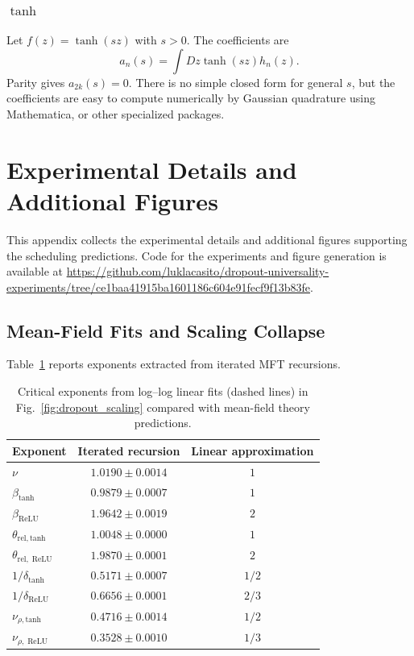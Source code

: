 \documentclass{article}
\DeclareMathOperator{\ReLU}{ReLU}
\theoremstyle{plain}
\theoremstyle{definition}
\theoremstyle{remark}
\begin{document}
\subsubsection{\texorpdfstring{\(\tanh\)}{tanh}}

Let \(f(z)=\tanh(s z)\) with \(s>0\). The coefficients are
\relax
\begin{equation}
a_{n}(s)=\int Dz \tanh(s z) h_{n}(z).
\end{equation}
\relax
Parity gives \(a_{2k}(s)=0\). There is no simple closed form for general \(s\), but the coefficients are easy to compute numerically by Gaussian quadrature using Mathematica, or other specialized packages.










\section{Experimental Details and Additional Figures}
\label{app:experimental_info}
This appendix collects the experimental details and additional figures supporting the scheduling predictions. Code for the experiments and figure generation is available at \url{https://github.com/luklacasito/dropout-universality-experiments/tree/ce1baa41915ba1601186c604e91fecf9f13b83fe}.










\subsection{Mean-Field Fits and Scaling Collapse}
Table~\ref{tab:mf_vs_fit_exponents} reports exponents extracted from iterated MFT recursions.
\begin{table}[ht]
\caption{Critical exponents from log--log linear fits (dashed lines) in Fig.~\ref{fig:dropout_scaling} compared with mean-field theory predictions.}
\label{tab:mf_vs_fit_exponents}
\centering
\begin{tabular}{lcc}
\toprule
Exponent & Iterated recursion & Linear approximation \\
\midrule
$\nu$ & $1.0190 \pm 0.0014$ & $1$ \\
$\beta_{\mathrm{tanh}}$ & $0.9879 \pm 0.0007$ & $1$ \\
$\beta_{\ReLU}$ & $1.9642 \pm 0.0019$ & $2$ \\
$\theta_{\mathrm{rel,tanh}}$ & $1.0048 \pm 0.0000$ & $1$ \\
$\theta_{\mathrm{rel},\ReLU}$ & $1.9870 \pm 0.0001$ & $2$ \\
$1/\delta_{\mathrm{tanh}}$ & $0.5171 \pm 0.0007$ & $1/2$ \\
$1/\delta_{\ReLU}$ & $0.6656 \pm 0.0001$ & $2/3$ \\
$\nu_{\rho,\mathrm{tanh}}$ & $0.4716 \pm 0.0014$ & $1/2$ \\
$\nu_{\rho,\ReLU}$ & $0.3528 \pm 0.0010$ & $1/3$ \\
\bottomrule
\end{tabular}
\end{table}
\end{document}
